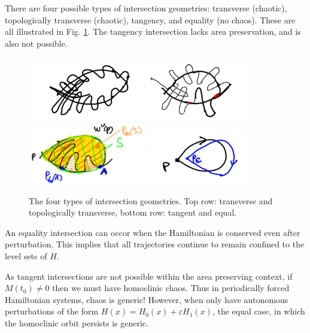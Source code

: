 There are four possible types of intersection geometries: transverse (chaotic), topologically transverse (chaotic), tangency, and equality (no chaos). These are all illustrated in Fig. \ref{fig:intersection_types}. The tangency intersection lacks area preservation, and is also not possible.

\begin{figure}[h!]
	\centering
	\includegraphics[width=0.45\textwidth]{figures/ch8/10intersection_geometry_A.png}
	\includegraphics[width=0.4\textwidth]{figures/ch8/10intersection_geometry_B.png}
	\includegraphics[width=0.45\textwidth]{figures/ch8/10intersection_geometry_C.png}
	\includegraphics[width=0.4\textwidth]{figures/ch8/10intersection_geometry_D.png}
	\caption{The four types of intersection geometries. Top row: transverse and topologically transverse, bottom row: tangent and equal.}
	\label{fig:intersection_types}
\end{figure}

An equality intersection can occor when the Hamiltonian is conserved even after perturbation. This implies that all trajectories continue to remain confined to the level sets of $H$. 

As tangent intersections are not possible within the area preserving context, if $M(t_0) \neq 0$ then we must have homoclinic chaos. Thus in periodically forced Hamiltonian systems, chaos is generic! However, when only have autonomous perturbations of the form $H(x)=H_0(x)+\varepsilon H_1(x)$, the equal case, in which the homoclinic orbit persists is generic. 

